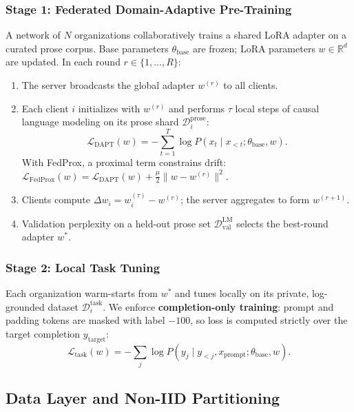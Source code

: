 \documentclass[11pt,a4paper]{article}
\begin{document}
\subsubsection{Stage 1: Federated Domain-Adaptive Pre-Training}
A network of $N$ organizations collaboratively trains a shared LoRA adapter on a curated prose corpus. Base parameters $\theta_{\text{base}}$ are frozen; LoRA parameters $w \in \mathbb{R}^d$ are updated. In each round $r \in \{1,\dots,R\}$:
\begin{enumerate}
    \item The server broadcasts the global adapter $w^{(r)}$ to all clients.
    \item Each client $i$ initializes with $w^{(r)}$ and performs $\tau$ local steps of causal language modeling on its prose shard $\mathcal{D}_i^{\text{prose}}$:
    \begin{equation}
        \mathcal{L}_{\text{DAPT}}(w) = -\sum_{t=1}^{T} \log P(x_t \mid x_{<t}; \theta_{\text{base}}, w).
    \end{equation}
    With FedProx, a proximal term constrains drift: $\mathcal{L}_{\text{FedProx}}(w) = \mathcal{L}_{\text{DAPT}}(w) + \tfrac{\mu}{2}\|w - w^{(r)}\|^2$.
    \item Clients compute $\Delta w_i = w_i^{(\tau)} - w^{(r)}$; the server aggregates to form $w^{(r+1)}$.
    \item Validation perplexity on a held-out prose set $\mathcal{D}_{\text{val}}^{\text{LM}}$ selects the best-round adapter $w^*$.
\end{enumerate}

\subsubsection{Stage 2: Local Task Tuning}
Each organization warm-starts from $w^*$ and tunes locally on its private, log-grounded dataset $\mathcal{D}_i^{\text{task}}$. We enforce \textbf{completion-only training}: prompt and padding tokens are masked with label $-100$, so loss is computed strictly over the target completion $y_{\text{target}}$:
\begin{equation}
    \mathcal{L}_{\text{task}}(w) = -\sum_{j} \log P(y_j \mid y_{<j}, x_{\text{prompt}}; \theta_{\text{base}}, w).
\end{equation}

\subsection{Data Layer and Non-IID Partitioning}
\end{document}
